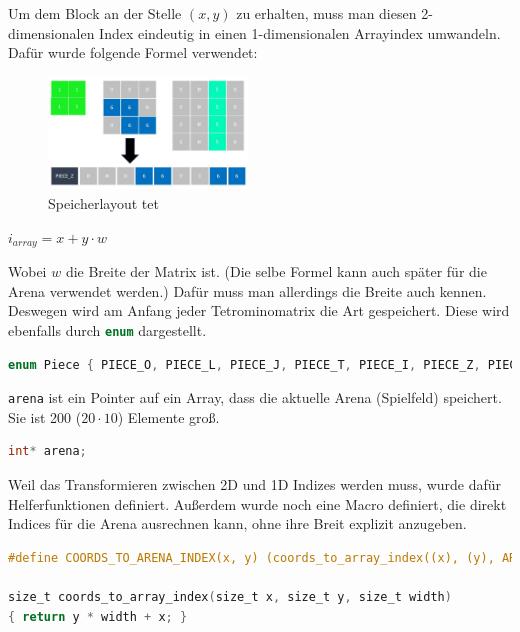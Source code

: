 \documentclass[11pt]{article}
\newcommand{\lstin}[1]{\lstinline[language=C]{#1}}
\begin{document}
Um dem Block an der Stelle $(x, y)$ zu erhalten, muss man diesen 2-dimensionalen Index eindeutig in einen 1-dimensionalen Arrayindex umwandeln. Dafür wurde folgende Formel verwendet:

\begin{figure}[h]
  \centering
  \includegraphics[width=200px]{../images/mem_layout.jpg}
  \caption{Speicherlayout \gls{tet}}
\end{figure}

\begin{center}
  \begin{math}
    i_{array} = x + y \cdot w
  \end{math}
\end{center}

Wobei $w$ die Breite der Matrix ist. (Die selbe Formel kann auch später für die Arena verwendet werden.)
Dafür muss man allerdings die Breite auch kennen. Deswegen wird am Anfang jeder Tetrominomatrix die Art gespeichert. Diese wird ebenfalls durch \lstin{enum} dargestellt.

\begin{lstlisting}[language=C]
enum Piece { PIECE_O, PIECE_L, PIECE_J, PIECE_T, PIECE_I, PIECE_Z, PIECE_S };
\end{lstlisting}

\lstin{arena} ist ein Pointer auf ein Array, dass die aktuelle Arena (Spielfeld) speichert. Sie ist 200 ($20 \cdot 10$) Elemente groß.
\begin{lstlisting}[language=C]
int* arena;  
\end{lstlisting}

Weil das Transformieren zwischen 2D und 1D Indizes werden muss, wurde dafür Helferfunktionen definiert. Außerdem wurde noch eine Macro definiert, die direkt Indices für die Arena ausrechnen kann, ohne ihre Breit explizit anzugeben.

\begin{lstlisting}[language=C]
#define COORDS_TO_ARENA_INDEX(x, y) (coords_to_array_index((x), (y), ARENA_WIDTH))

size_t coords_to_array_index(size_t x, size_t y, size_t width)
{ return y * width + x; }
\end{lstlisting}
\end{document}
